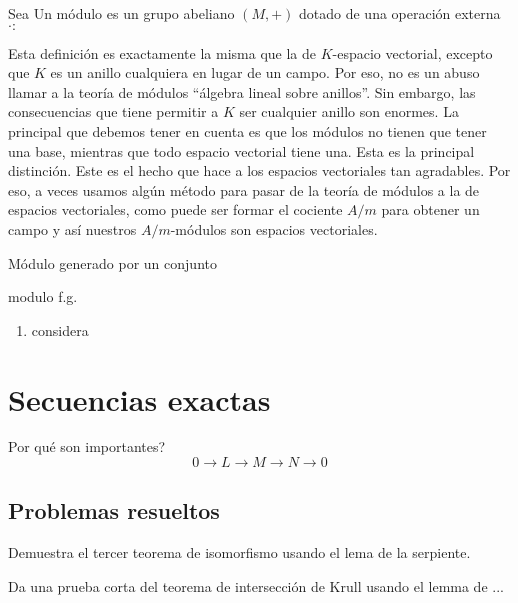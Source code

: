 \documentclass[b5paper,10pt]{book}
\begin{document}
\begin{defi}
Sea 
Un módulo es un grupo abeliano \((M,+)\) dotado de una operación externa
\(\cdot: 	\)
\end{defi}

Esta definición es exactamente la misma que la de \(K\)-espacio vectorial,
excepto que \(K\) es un anillo cualquiera en lugar de un campo.
Por eso, no es un abuso llamar a la teoría de módulos 
``álgebra lineal sobre anillos''.
Sin embargo, 
las consecuencias que tiene permitir a \(K\) ser cualquier anillo
son enormes.
La principal que debemos tener en cuenta es que 
los módulos no tienen que tener una base, mientras
que todo espacio vectorial tiene una.
Esta es la principal distinción.
Este es el hecho que hace a los espacios vectoriales tan agradables.
Por eso, a veces usamos algún método
para pasar de la teoría de módulos a la de
espacios vectoriales, como puede ser 
formar el cociente \(A/m\) para obtener un campo
y así nuestros \(A/m\)-módulos son espacios vectoriales.

\begin{defi}
Módulo generado por un conjunto
\end{defi}

\begin{defi}
modulo f.g.
\end{defi}

\begin{ej}
\begin{enumerate}[label=(i)]
	\item considera
\end{enumerate}
\end{ej}

\section{Secuencias exactas}

Por qué son importantes?
\[
0\to L \to M\to N\to 0
\]

\subsection{Problemas resueltos}

\begin{problema}
Demuestra el tercer teorema de isomorfismo usando el lema de la serpiente.
\end{problema}

\begin{problema}
Da una prueba corta del teorema de intersección de Krull usando el
lemma de ... 
\end{problema}
\end{document}
